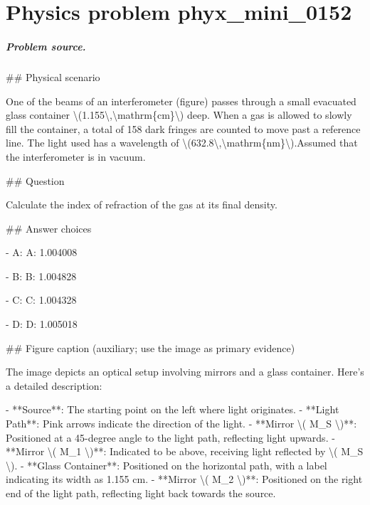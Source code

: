 
\chapter{Physics problem phyx\_mini\_0152}
\label{ch:PhyXMiniProblems_problem_phyx_mini_0152}

\paragraph{Problem source.}
\#\# Physical scenario

One of the beams of an interferometer (figure) passes through a small evacuated glass container \textbackslash{}(1.155\textbackslash{},\textbackslash{}mathrm\{cm\}\textbackslash{}) deep. When a gas is allowed to slowly fill the container, a total of 158 dark fringes are counted to move past a reference line. The light used has a wavelength of \textbackslash{}(632.8\textbackslash{},\textbackslash{}mathrm\{nm\}\textbackslash{}).Assumed that the interferometer is in vacuum.

\#\# Question

Calculate the index of refraction of the gas at its final density.

\#\# Answer choices

- A: A: 1.004008

- B: B: 1.004828

- C: C: 1.004328

- D: D: 1.005018

\#\# Figure caption (auxiliary; use the image as primary evidence)

The image depicts an optical setup involving mirrors and a glass container. Here's a detailed description:

- **Source**: The starting point on the left where light originates.
- **Light Path**: Pink arrows indicate the direction of the light.
- **Mirror \textbackslash{}( M\_S \textbackslash{})**: Positioned at a 45-degree angle to the light path, reflecting light upwards.
- **Mirror \textbackslash{}( M\_1 \textbackslash{})**: Indicated to be above, receiving light reflected by \textbackslash{}( M\_S \textbackslash{}).
- **Glass Container**: Positioned on the horizontal path, with a label indicating its width as 1.155 cm.
- **Mirror \textbackslash{}( M\_2 \textbackslash{})**: Positioned on the right end of the light path, reflecting light back towards the source.

